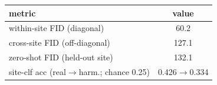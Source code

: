 \begin{tabular}{lc}
\toprule
metric & value \\
\midrule
within-site FID (diagonal) & 60.2 \\
cross-site FID (off-diagonal) & 127.1 \\
zero-shot FID (held-out site) & 132.1 \\
site-clf acc (real$\to$harm.; chance 0.25) & 0.426$\to$0.334 \\
\bottomrule
\end{tabular}
